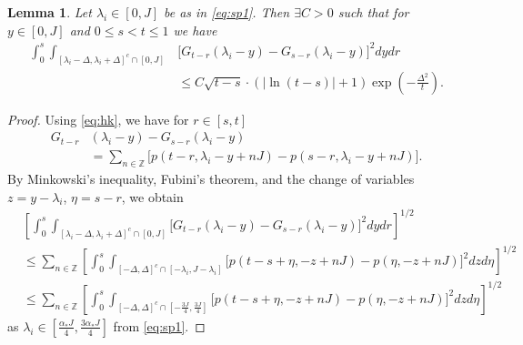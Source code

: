 \documentclass[10pt,a4paper]{amsart}
\newtheorem{lem}{Lemma}
\newcommand{\Z}{\mathbb{Z}}
\begin{document}
\begin{lem} \label{lem:secterm}
 Let $\lambda_i \in [0,J]$  be as in \eqref{eq:sp1}.  
Then $\exists C >0$ such that for $y \in [0,J]$ 
and $0\leq s < t\leq 1$ we have 
\begin{align*}
\int_{0}^{s}\int_{[\lambda_i-\Delta,\lambda_i+\Delta]^c\cap[0,J]}
  &\Big[ G_{t-r}(\lambda_i-y)-G_{s-r}(\lambda_i-y) \Big]^2dydr  \\
&\leq C\sqrt{t-s}\cdot\left(\big|\ln(t-s)\big|+1\right)
      \exp\left(-\frac{\Delta^2}{t}\right).  
\end{align*}
\end{lem}

\begin{proof} 
Using \eqref{eq:hk}, we have for $r \in [s,t]$
\begin{align*}
G_{t-r}&(\lambda_i-y)-G_{s-r}(\lambda_i-y)  \\
& = \sum_{n\in \Z}\Big[p(t-r,{\lambda}_i-y+nJ) - p(s-r,{\lambda}_i-y+nJ) \Big].
\end{align*}
By Minkowski's inequality, Fubini's theorem, and
the change of variables $z=y-\lambda_i$, $\eta=s-r$, we obtain
\begin{equation} \label{eq:sum_n}
\begin{split}
&\left[\int_{0}^{s}\int_{[\lambda_i-\Delta,\lambda_i+\Delta]^c\cap[0,J]}
  \Big[ G_{t-r}(\lambda_i-y)-G_{s-r}(\lambda_i-y) \Big]^2dydr\right]^{1/2} \\
&\le \sum_{n\in\mathbb{Z}} \left[\int_{0}^{s}
    \int_{[-\Delta,\Delta]^c\cap[-\lambda_i,J-\lambda_i]}
    \Big[p(t-s +\eta,-z+nJ)-p(\eta,-z+nJ)\Big]^2dzd\eta\right]^{1/2}  \\
&\le \sum_{n\in\mathbb{Z}} \left[\int_{0}^{s}
    \int_{[-\Delta,\Delta]^c\cap\left[-\frac{3J}{4},\frac{3J}{4}\right]}
    \Big[p(t-s +\eta,-z+nJ)-p(\eta,-z+nJ)\Big]^2dzd\eta\right]^{1/2} 
\end{split}
\end{equation}
as $\lambda_i\in[\frac{\alpha_*J}{4},\frac{3\alpha_*J}{4}]$ from
\eqref{eq:sp1}.


\end{proof}
\end{document}
